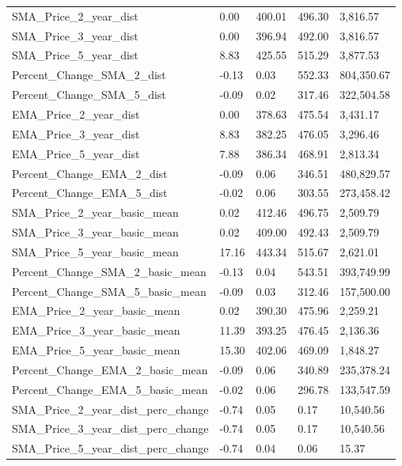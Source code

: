 \documentclass[12pt,]{article}
\begin{document}
\begin{table}
{\begin{tabular}[t]{lllll}
SMA\_Price\_2\_year\_dist & 0.00 & 400.01 & 496.30 & 3,816.57\\
\addlinespace
SMA\_Price\_3\_year\_dist & 0.00 & 396.94 & 492.00 & 3,816.57\\
SMA\_Price\_5\_year\_dist & 8.83 & 425.55 & 515.29 & 3,877.53\\
Percent\_Change\_SMA\_2\_dist & -0.13 & 0.03 & 552.33 & 804,350.67\\
Percent\_Change\_SMA\_5\_dist & -0.09 & 0.02 & 317.46 & 322,504.58\\
EMA\_Price\_2\_year\_dist & 0.00 & 378.63 & 475.54 & 3,431.17\\
\addlinespace
EMA\_Price\_3\_year\_dist & 8.83 & 382.25 & 476.05 & 3,296.46\\
EMA\_Price\_5\_year\_dist & 7.88 & 386.34 & 468.91 & 2,813.34\\
Percent\_Change\_EMA\_2\_dist & -0.09 & 0.06 & 346.51 & 480,829.57\\
Percent\_Change\_EMA\_5\_dist & -0.02 & 0.06 & 303.55 & 273,458.42\\
SMA\_Price\_2\_year\_basic\_mean & 0.02 & 412.46 & 496.75 & 2,509.79\\
\addlinespace
SMA\_Price\_3\_year\_basic\_mean & 0.02 & 409.00 & 492.43 & 2,509.79\\
SMA\_Price\_5\_year\_basic\_mean & 17.16 & 443.34 & 515.67 & 2,621.01\\
Percent\_Change\_SMA\_2\_basic\_mean & -0.13 & 0.04 & 543.51 & 393,749.99\\
Percent\_Change\_SMA\_5\_basic\_mean & -0.09 & 0.03 & 312.46 & 157,500.00\\
EMA\_Price\_2\_year\_basic\_mean & 0.02 & 390.30 & 475.96 & 2,259.21\\
\addlinespace
EMA\_Price\_3\_year\_basic\_mean & 11.39 & 393.25 & 476.45 & 2,136.36\\
EMA\_Price\_5\_year\_basic\_mean & 15.30 & 402.06 & 469.09 & 1,848.27\\
Percent\_Change\_EMA\_2\_basic\_mean & -0.09 & 0.06 & 340.89 & 235,378.24\\
Percent\_Change\_EMA\_5\_basic\_mean & -0.02 & 0.06 & 296.78 & 133,547.59\\
SMA\_Price\_2\_year\_dist\_perc\_change & -0.74 & 0.05 & 0.17 & 10,540.56\\
\addlinespace
SMA\_Price\_3\_year\_dist\_perc\_change & -0.74 & 0.05 & 0.17 & 10,540.56\\
SMA\_Price\_5\_year\_dist\_perc\_change & -0.74 & 0.04 & 0.06 & 15.37\\

\end{tabular}}
\end{table}
\end{document}
